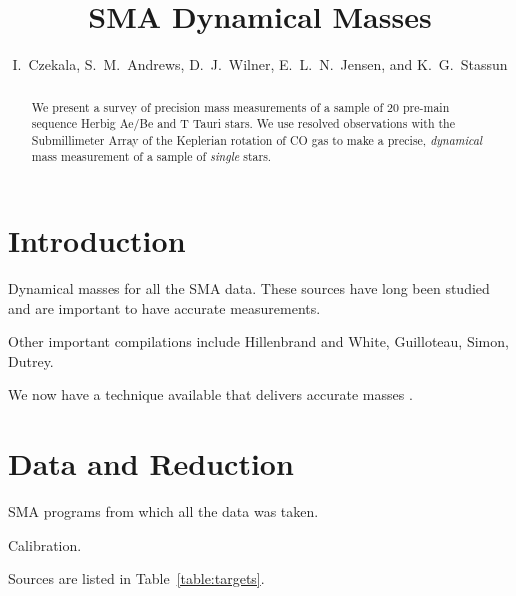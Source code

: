 \documentclass[twocolumn]{aastex6}
\begin{document}
\title{SMA Dynamical Masses}
\author{I.~Czekala, S.~M.~Andrews, D.~J.~Wilner, E.~L.~N.~Jensen, and K.~G.~Stassun}


\begin{abstract}
We present a survey of precision mass measurements of a sample of 20 pre-main sequence Herbig Ae/Be and T Tauri stars. We use resolved observations with the Submillimeter Array of the Keplerian rotation of CO gas to make a precise, \emph{dynamical} mass measurement of a sample of \emph{single} stars.
\end{abstract}


\section{Introduction}

Dynamical masses for all the SMA data. These sources have long been studied and are important to have accurate measurements.

Other important compilations include Hillenbrand and White, Guilloteau, Simon, Dutrey.

We now have a technique available that delivers accurate masses \citep{rosenfeld12b, czekala15a, czekala16}.

\section{Data and Reduction}

SMA programs from which all the data was taken.

Calibration.

Sources are listed in Table~\ref{table:targets}.
\end{document}
